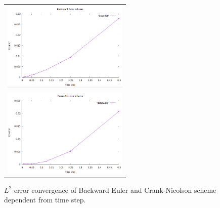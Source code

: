 \begin{figure}[http]
	\centering
	\begin{tabular}{c}
		\includegraphics[width=6cm]{figures/BEt} \\ \includegraphics[width=6cm]{figures/CNt}
	\end{tabular}
	\caption{$L^2$ error convergence of Backward Euler and Crank-Nicolson scheme dependent from time step.}
\end{figure}

